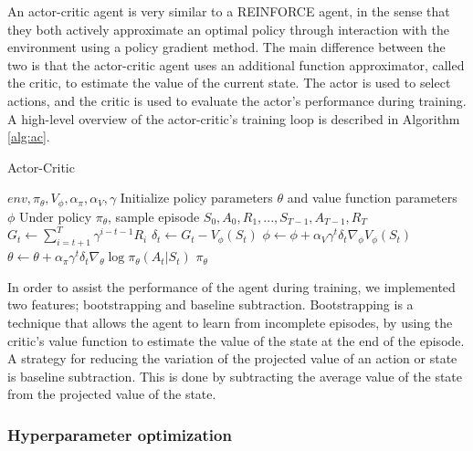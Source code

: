 \documentclass{article}
\begin{document}
An actor-critic agent is very similar to a REINFORCE agent, in the sense that they both actively approximate an optimal policy through interaction with the environment using a policy gradient method.
The main difference between the two is that the actor-critic agent uses an additional function approximator, called the critic, to estimate the value of the current state.
The actor is used to select actions, and the critic is used to evaluate the actor's performance during training.
A high-level overview of the actor-critic's training loop is described in Algorithm \ref{alg:ac}.

\begin{algorithm}[htbp]
    \caption{Actor-Critic}
    \label{alg:ac}
    \begin{algorithmic}
         $env, \pi_{\theta}, V_{\phi}, \alpha_{\pi}, \alpha_{V}, \gamma$
        \STATE Initialize policy parameters $\theta$ and value function parameters $\phi$
        \REPEAT
            \STATE Under policy $\pi_{\theta}$, 
            \STATE sample episode $S_0, A_0, R_1, ..., S_{T-1}, A_{T-1}, R_T$
                \STATE $G_t \gets \sum\limits_{i=t+1}^T \gamma^{i-t-1} R_i$
                \STATE $\delta_t \gets G_t - V_{\phi}(S_t)$
                \STATE $\phi \gets \phi + \alpha_{V} \gamma^t \delta_t \nabla_{\phi} V_{\phi}(S_t)$
                \STATE $\theta \gets \theta + \alpha_{\pi} \gamma^t \delta_t \nabla_{\theta} \log \pi_{\theta}(A_t|S_t)$
            \ENDFOR
         $\pi_{\theta}$
    \end{algorithmic}
\end{algorithm}


In order to assist the performance of the agent during training, we implemented two features; bootstrapping and baseline subtraction.
Bootstrapping is a technique that allows the agent to learn from incomplete episodes, by using the critic's value function to estimate the value of the state at the end of the episode.
A strategy for reducing the variation of the projected value of an action or state is baseline subtraction. 
This is done by subtracting the average value of the state from the projected value of the state.


\subsubsection{Hyperparameter optimization}
\label{AC-HPO}
\end{document}
